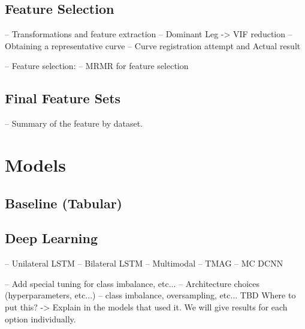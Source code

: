 \subsection{Feature Selection}\label{subsec:method-feature-selection}
-- Transformations and feature extraction
    -- Dominant Leg -> VIF reduction
    -- Obtaining a representative curve
        -- Curve registration attempt and Actual result

-- Feature selection:
    -- MRMR for feature selection



\subsection{Final Feature Sets}\label{subsec:method-final-feature-sets}
-- Summary of the feature by dataset.

\section{Models}\label{sec:method-models}
\subsection{Baseline (Tabular)}\label{subsec:method-baselines}
\subsection{Deep Learning}\label{subsec:method-deep-learning}
-- Unilateral LSTM
-- Bilateral LSTM
-- Multimodal
-- TMAG
-- MC DCNN

-- Add special tuning for class imbalance, etc...
-- Architecture choices (hyperparameters, etc...)
-- class imbalance, oversampling, etc... TBD Where to put this? -> Explain in the models that used it. We will give results for each option individually.


